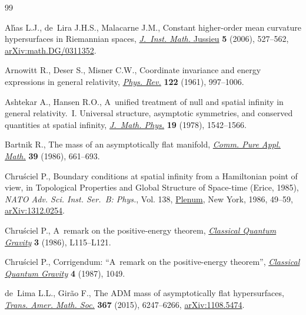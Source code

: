 \documentclass[pdftex]{sigma}
\numberwithin{equation}{section}
\begin{document}
%
%

\begin{thebibliography}{99}
\footnotesize\itemsep=0pt

Al\'{\i}as L.J., de~Lira J.H.S., Malacarne J.M., Constant higher-order mean
 curvature hypersurfaces in {R}iemannian spaces, \href{https://doi.org/10.1017/S1474748006000077}{\textit{J.~Inst. Math.}
 Jussieu} \textbf{5} (2006), 527--562, \href{https://arxiv.org/abs/math.DG/0311352}{arXiv:math.DG/0311352}.

Arnowitt R., Deser S., Misner C.W., Coordinate invariance and energy
 expressions in general relativity, \href{https://doi.org/10.1103/PhysRev.122.997}{\textit{Phys. Rev.}} \textbf{122} (1961),
 997--1006.

Ashtekar A., Hansen R.O., A~unified treatment of null and spatial infinity in
 general relativity.~{I}. {U}niversal structure, asymptotic symmetries, and
 conserved quantities at spatial infinity, \href{https://doi.org/10.1063/1.523863}{\textit{J.~Math. Phys.}} \textbf{19}
 (1978), 1542--1566.

Bartnik R., The mass of an asymptotically flat manifold, \href{https://doi.org/10.1002/cpa.3160390505}{\textit{Comm. Pure
 Appl. Math.}} \textbf{39} (1986), 661--693.

Chru\'sciel P., Boundary conditions at spatial infinity from a {H}amiltonian
 point of view, in Topological Properties and Global Structure of Space-time
 ({E}rice, 1985), \textit{NATO Adv. Sci. Inst. Ser.~B: Phys.}, Vol. 138,
 \href{https://doi.org/10.1007/978-1-4899-3626-4_5}{Plenum}, New York, 1986, 49--59, \href{https://arxiv.org/abs/1312.0254}{arXiv:1312.0254}.

Chru\'sciel P., A~remark on the positive-energy theorem, \href{https://dx.doi.org/10.1088/0264-9381/3/6/002}{\textit{Classical
 Quantum Gravity}} \textbf{3} (1986), L115--L121.

Chru\'sciel P., Corrigendum: ``{A}~remark on the positive-energy theorem'',
 \href{https://doi.org/10.1088/0264-9381/4/4/536}{\textit{Classical Quantum Gravity}} \textbf{4} (1987), 1049.

de~Lima L.L., Gir\~ao F., The {ADM} mass of asymptotically flat hypersurfaces,
 \href{https://doi.org/10.1090/S0002-9947-2014-05902-3}{\textit{Trans. Amer. Math. Soc.}} \textbf{367} (2015), 6247--6266,
 \href{https://arxiv.org/abs/1108.5474}{arXiv:1108.5474}.


\end{thebibliography}
\end{document}
